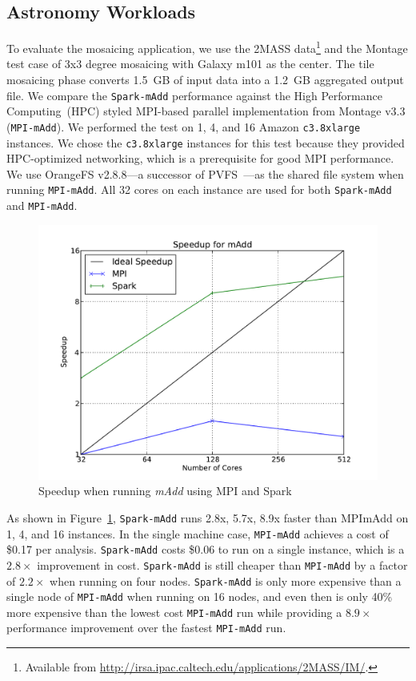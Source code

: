 \documentclass{acm_proc_article-sp}
\begin{document}
\subsection{Astronomy Workloads}
\label{sec:astro-workloads}

To evaluate the mosaicing application, we use the 2MASS data\footnote{Available from
\url{http://irsa.ipac.caltech.edu/applications/2MASS/IM/}.} and the Montage test case of 3x3 degree
mosaicing with Galaxy m101 as the center. The tile mosaicing phase converts 1.5~GB of input data into a
1.2~GB aggregated output file. We compare the \texttt{Spark-mAdd} performance against the High Performance
Computing~(HPC) styled MPI-based parallel implementation from Montage v3.3 (\texttt{MPI-mAdd}). We
performed the test on 1, 4, and 16 Amazon \texttt{c3.8xlarge} instances. We chose the \texttt{c3.8xlarge} instances
for this test because they provided HPC-optimized networking, which is a prerequisite for good MPI performance.
We use OrangeFS v2.8.8---a successor of PVFS~\cite{PVFS}---as the shared file system when running
\texttt{MPI-mAdd}. All 32 cores on each instance are used for both \texttt{Spark-mAdd} and \texttt{MPI-mAdd}.

\begin{figure}[h]
\begin{center}
\includegraphics[width=0.9\linewidth]{graphs/speedup_madd.pdf}
\end{center}
\caption{Speedup when running \textit{mAdd} using MPI and Spark}
\label{fig:madd-speedup}
\end{figure}

As shown in Figure~\ref{fig:madd-speedup}, \texttt{Spark-mAdd} runs 2.8x, 5.7x, 8.9x faster than
MPImAdd on 1, 4, and 16 instances. In the single machine case, \texttt{MPI-mAdd} achieves a cost of \$0.17 per
analysis. \texttt{Spark-mAdd} costs \$0.06 to run on a single instance, which is a $2.8\times$ improvement in
cost. \texttt{Spark-mAdd} is still cheaper than \texttt{MPI-mAdd} by a factor of $2.2\times$ when running on four
nodes. \texttt{Spark-mAdd} is only more expensive than a single node of \texttt{MPI-mAdd} when running on 16
nodes, and even then is only 40\% more expensive than the lowest cost \texttt{MPI-mAdd} run while providing a
$8.9\times$ performance improvement over the fastest \texttt{MPI-mAdd} run.
\end{document}
